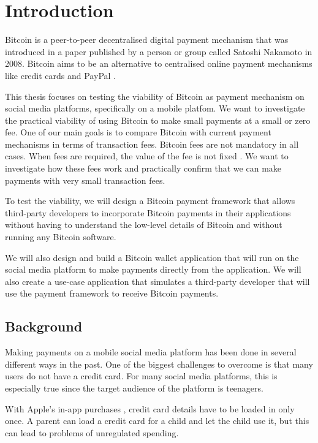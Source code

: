 \chapter{Introduction}
\label{chp:Intro}

Bitcoin \cite{Nakamoto2008} is a peer-to-peer decentralised digital payment mechanism that was introduced in a paper published by a person or group called Satoshi Nakamoto in 2008. Bitcoin aims to be an alternative to centralised online payment mechanisms like credit cards and PayPal \cite{PayPal2015}. 

This thesis focuses on testing the viability of Bitcoin as payment mechanism on social media platforms, specifically on a mobile platfom. We want to investigate the practical viability of using Bitcoin to make small payments at a small or zero fee. One of our main goals is to compare Bitcoin with current payment mechanisms in terms of transaction fees. Bitcoin fees are not mandatory in all cases. When fees are required, the value of the fee is not fixed \cite{bitcoinwiki}. We want to investigate how these fees work and practically confirm that we can make payments with very small transaction fees.

To test the viability, we will design a Bitcoin payment framework that allows third-party developers to incorporate Bitcoin payments in their applications without having to understand the low-level details of Bitcoin and without running any Bitcoin software. 

We will also design and build a Bitcoin wallet application that will run on the social media platform to make payments directly from the application. We will also create a use-case application that simulates a third-party developer that will use the payment framework to receive Bitcoin payments.




\section{Background}

Making payments on a mobile social media platform has been done in several different ways in the past. One of the biggest challenges to overcome is that many users do not have a credit card. For many social media platforms, this is especially true since the target audience of the platform is teenagers. 

With Apple's in-app purchases \cite{apple}, credit card details have to be loaded in only once. A parent can load a credit card for a child and let the child use it, but this can lead to problems of unregulated spending.

